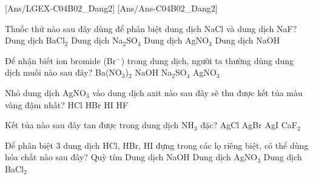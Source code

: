 \documentclass[Main.tex]{subfiles}
\begin{document}
    
    [Ans/LGEX-C04B02_Dang2]
    [Ans/Ans-C04B02_Dang2]
    \begin{ex}
        Thuốc thử nào sau đây dùng để phân biệt dung dịch NaCl và dung dịch NaF?
        \choice
        {Dung dịch BaCl$_2$}
        {Dung dịch Na$_2$SO$_4$}
        {\True Dung dịch AgNO$_3$}
        {Dung dịch NaOH}
    \end{ex}
    \begin{ex}
        Để nhận biết ion bromide (Br$^-$) trong dung dịch, người ta thường dùng dung dịch muối nào sau đây?
        \choice
        {Ba(NO$_3$)$_2$}
        {NaOH}
        {Na$_2$SO$_4$}
        {\True AgNO$_3$}
    \end{ex}
    \begin{ex}
        Nhỏ dung dịch AgNO$_3$ vào dung dịch axit nào sau đây sẽ thu được kết tủa màu vàng đậm nhất?
        \choice
        {HCl}
        {HBr}
        {\True HI}
        {HF}
    \end{ex}
    \begin{ex}
        Kết tủa nào sau đây tan được trong dung dịch NH$_3$ đặc?
        \choice
        {\True AgCl}
        {AgBr}
        {AgI}
        {CaF$_2$}
    \end{ex}
    \begin{ex}
        Để phân biệt 3 dung dịch HCl, HBr, HI đựng trong các lọ riêng biệt, có thể dùng hóa chất nào sau đây?
        \choice
        {Quỳ tím}
        {Dung dịch NaOH}
        {\True Dung dịch AgNO$_3$}
        {Dung dịch BaCl$_2$}
    \end{ex}
    
\end{document}

